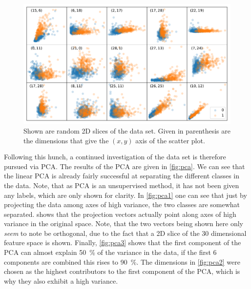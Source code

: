 \documentclass[12pt, a4paper]{scrartcl}
\begin{document}
\begin{figure}
	\centering
	\includegraphics[width=\textwidth]{random_scatter}
	\caption{Shown are random 2D slices of the data set. Given in parenthesis are the dimensions that give the $(x,y)$ axis of the scatter plot.}
	\label{fig:random_scatter}
\end{figure}

Following this hunch, a continued investigation of the data set is therefore pursued via PCA.
The results of the PCA are given in \cref{fig:pca}. We can see that the linear PCA is already fairly successful at separating the different classes in the data. Note, that as PCA is an unsupervised method, it has not been given any labels, which are only shown for clarity. In \cref{fig:pca1} one can see that just by projecting the data among axes of high variance, the two classes are somewhat separated.  shows that the projection vectors actually point along axes of high variance in the original space. Note, that the two vectors being shown here only \emph{seem} to note be orthogonal, due to the fact that a 2D slice of the 30 dimensional feature space is shown. Finally, \cref{fig:pca3} shows that the first component of the PCA can almost explain \SI{50}{\percent} of the variance in the data, if the first 6 components are combined this rises to \SI{90}{\percent}. 
The dimensions in \cref{fig:pca2} were chosen as the highest contributors to the first component of the PCA, which is why they also exhibit a high variance.
\end{document}
